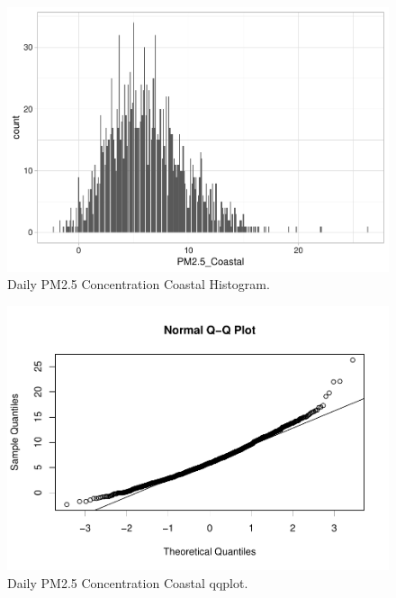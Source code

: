 \documentclass[12pt,]{article}
\begin{document}
\begin{figure}
\centering
\includegraphics{Raby_ENV872_Project_files/figure-latex/unnamed-chunk-42-1.pdf}
\caption{Daily PM2.5 Concentration Coastal Histogram.
\label{Coasthistplot}}
\end{figure}

\begin{figure}
\centering
\includegraphics{Raby_ENV872_Project_files/figure-latex/unnamed-chunk-43-1.pdf}
\caption{Daily PM2.5 Concentration Coastal qqplot. \label{Coastqqplot}}
\end{figure}
\end{document}
